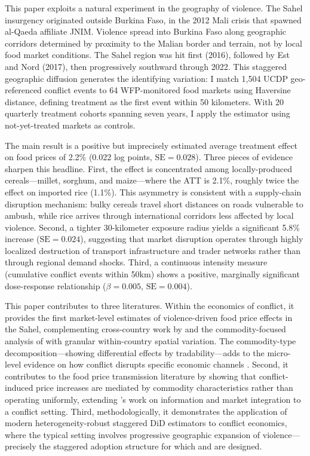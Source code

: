 \documentclass[12pt]{article}
\begin{document}
This paper exploits a natural experiment in the geography of violence. The Sahel insurgency originated outside Burkina Faso, in the 2012 Mali crisis that spawned al-Qaeda affiliate JNIM. Violence spread into Burkina Faso along geographic corridors determined by proximity to the Malian border and terrain, not by local food market conditions. The Sahel region was hit first (2016), followed by Est and Nord (2017), then progressively southward through 2022. This staggered geographic diffusion generates the identifying variation: I match 1,504 UCDP geo-referenced conflict events to 64 WFP-monitored food markets using Haversine distance, defining treatment as the first event within 50 kilometers. With 20 quarterly treatment cohorts spanning seven years, I apply the \citet{callaway2021difference} estimator using not-yet-treated markets as controls.

The main result is a positive but imprecisely estimated average treatment effect on food prices of 2.2\% (0.022 log points, $\text{SE} = 0.028$). Three pieces of evidence sharpen this headline. First, the effect is concentrated among locally-produced cereals---millet, sorghum, and maize---where the ATT is 2.1\%, roughly twice the effect on imported rice (1.1\%). This asymmetry is consistent with a supply-chain disruption mechanism: bulky cereals travel short distances on roads vulnerable to ambush, while rice arrives through international corridors less affected by local violence. Second, a tighter 30-kilometer exposure radius yields a significant 5.8\% increase ($\text{SE} = 0.024$), suggesting that market disruption operates through highly localized destruction of transport infrastructure and trader networks rather than through regional demand shocks. Third, a continuous intensity measure (cumulative conflict events within 50km) shows a positive, marginally significant dose-response relationship ($\beta = 0.005$, $\text{SE} = 0.004$).

This paper contributes to three literatures. Within the economics of conflict, it provides the first market-level estimates of violence-driven food price effects in the Sahel, complementing cross-country work by \citet{bazzi2019economic} and the commodity-focused analysis of \citet{dube2013commodity} with granular within-country spatial variation. The commodity-type decomposition---showing differential effects by tradability---adds to the micro-level evidence on how conflict disrupts specific economic channels \citep{amodio2022making}. Second, it contributes to the food price transmission literature by showing that conflict-induced price increases are mediated by commodity characteristics rather than operating uniformly, extending \citet{aker2010information}'s work on information and market integration to a conflict setting. Third, methodologically, it demonstrates the application of modern heterogeneity-robust staggered DiD estimators to conflict economics, where the typical setting involves progressive geographic expansion of violence---precisely the staggered adoption structure for which \citet{callaway2021difference} and \citet{sun2021estimating} are designed.
\end{document}

